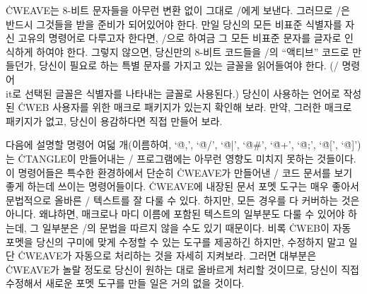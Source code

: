 \more
\.{CWEAVE}는 8-비트 문자들을 아무런 변환 없이 그대로 \TEX/에게 보낸다.
그러므로 \TEX/은 반드시 그것들을 받을 준비가 되어있어야 한다.
만일 당신의 모든 비표준 식별자를 자신 고유의 명령어로 다루고자 한다면,
\TEX/으로 하여금 그 모든 비표준 문자를 글자로 인식하게 하여야 한다.
그렇지 않으면, 당신만의 8-비트 코드들을 \TEX/의 ``액티브'' 코드로
만들던가, 당신이 필요로 하는 특별 문자를 가지고 있는 글꼴을 읽어들여야 한다.
(\TEX/ 명령어 \.{\\it}로 선택된 글꼴은 식별자를 나타내는 글꼴로
사용된다.) 당신이 사용하는 언어로 작성된 \.{CWEB} 사용자를 위한 매크로
패키지가 있는지 확인해 보라. 만약, 그러한 매크로 패키지가 없고, 당신이
용감하다면 직접 만들어 보라.

\subsec
다음에 설명할 명령어 여덟 개(이름하여, `\.{@,}', `\.{@/}', `\.{@|}', `\.{@\#}',
`\.{@+}', `\.{@;}', `\.{@[}', `\.{@]}')는 \.{CTANGLE}이 만들어내는
\CEE/ 프로그램에는 아무런 영향도 미치지 못하는 것들이다. 이 명령어들은
특수한 환경하에서 단순히 \.{CWEAVE}가 만들어낸 \CEE/ 코드 문서를 보기
좋게 하는데 쓰이는 명령어들이다.
\.{CWEAVE}에 내장된 문서 포멧 도구는 매우 좋아서 문법적으로 올바른
\CEE/ 텍스트를 잘 다룰 수 있다. 하지만, 모든 경우를 다 커버하는 것은
아니다. 왜냐하면, 매크로나 마디 이름에 포함된 텍스트의 일부분도 다룰 수
있어야 하는데, 그 일부분은 \CEE/의 문법을 따르지 않을 수도 있기 때문이다.
비록 \.{CWEB}이 자동 포멧을 당신의 구미에 맞게 수정할 수 있는 도구를
제공하긴 하지만, 수정하지 말고 일단 \.{CWEAVE}가 자동으로 처리하는
것을 자세히 지켜보라. 그러면 대부분은 \.{CWEAVE}가 놀랄 정도로
당신이 원하는 대로 올바르게 처리할 것이므로, 당신이 직접 수정해서
새로운 포멧 도구를 만들 일은 거의 없을 것이다.

